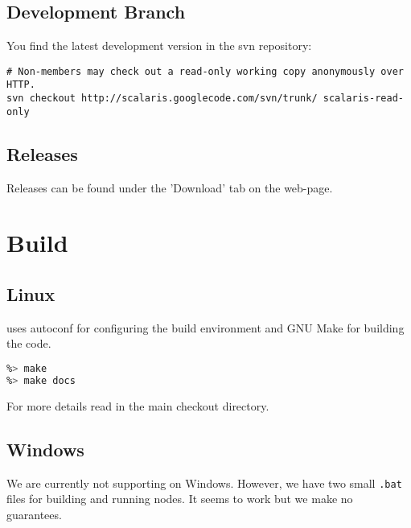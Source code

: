 \subsection{Development Branch}

You find the latest development version in the svn repository:
\begin{lstlisting}[language={}]
# Non-members may check out a read-only working copy anonymously over HTTP.
svn checkout http://scalaris.googlecode.com/svn/trunk/ scalaris-read-only
\end{lstlisting}

\subsection{Releases}

Releases can be found under the 'Download' tab on the web-page.


\section{Build}

\subsection{Linux}

\scalaris{} uses autoconf for configuring the build environment and
GNU Make for building the code.

\begin{lstlisting}[language=sh]
%> ./configure
%> make
%> make docs
\end{lstlisting}

For more details read  in the main \scalaris{} checkout
directory.

\subsection{Windows}

We are currently not supporting \scalaris{} on Windows. However, we
have two small {\tt .bat} files for building and running \scalaris{}
nodes. It seems to work but we make no guarantees.

